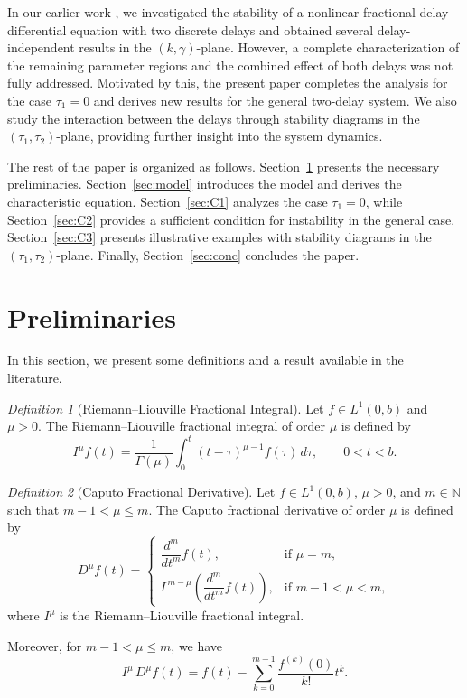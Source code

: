 \documentclass[11pt]{article}
\theoremstyle{remark}
\newtheorem{definition}{Definition}[section]
\begin{document}
In our earlier work \cite{dutta2025some}, we investigated the stability of a nonlinear fractional delay differential equation with two discrete delays and obtained several delay-independent results in the $(k,\gamma)$-plane. However, a complete characterization of the remaining parameter regions and the combined effect of both delays was not fully addressed. Motivated by this, the present paper completes the analysis for the case $\tau_1 = 0$ and derives new results for the general two-delay system. We also study the interaction between the delays through stability diagrams in the $(\tau_1,\tau_2)$-plane, providing further insight into the system dynamics.

The rest of the paper is organized as follows. Section~\ref{sec:prelim} presents the necessary preliminaries. Section~\ref{sec:model} introduces the model and derives the characteristic equation. Section~\ref{sec:C1} analyzes the case $\tau_1 = 0$, while Section~\ref{sec:C2} provides a sufficient condition for instability in the general case. Section~\ref{sec:C3} presents illustrative examples with stability diagrams in the $(\tau_1,\tau_2)$-plane. Finally, Section~\ref{sec:conc} concludes the paper.

	\section{Preliminaries}
\label{sec:prelim}
In this section, we present some definitions \cite{podlubny1998fractional,kilbas2006theory,lakshmanan2011dynamics,smith2010introduction} and a result \cite{bhalekar2016stability} available in the literature.

\begin{definition}[Riemann--Liouville Fractional Integral]
	Let $f \in L^{1}(0,b)$ and $\mu > 0$. The Riemann--Liouville fractional integral of order $\mu$ is defined by
	\begin{equation*}
		I^{\mu} f(t)
		= \frac{1}{\Gamma(\mu)} \int_{0}^{t} (t-\tau)^{\mu-1} f(\tau)\, d\tau,
		\qquad 0 < t < b. 
	\end{equation*}
\end{definition}
\begin{definition}[Caputo Fractional Derivative]
	Let $f \in L^{1}(0,b)$, $\mu > 0$, and $m \in \mathbb{N}$ such that $m-1 < \mu \le m$. The Caputo fractional derivative of order $\mu$ is defined by
	\[
	D^{\mu} f(t) =
	\begin{cases}
		\dfrac{d^{m}}{dt^{m}} f(t), & \text{if } \mu = m, \\[8pt]
		I^{\,m-\mu} \left( \dfrac{d^{m}}{dt^{m}} f(t) \right), & \text{if } m-1 < \mu < m,
	\end{cases}
	\]
	where $I^{\mu}$ is the Riemann--Liouville fractional integral.
	
	Moreover, for $m-1 < \mu \le m$, we have
	\[
	I^{\mu} \, D^{\mu} f(t)
	= f(t) - \sum_{k=0}^{m-1} \frac{f^{(k)}(0)}{k!} t^{k}.
	\]
\end{definition}
\end{document}
